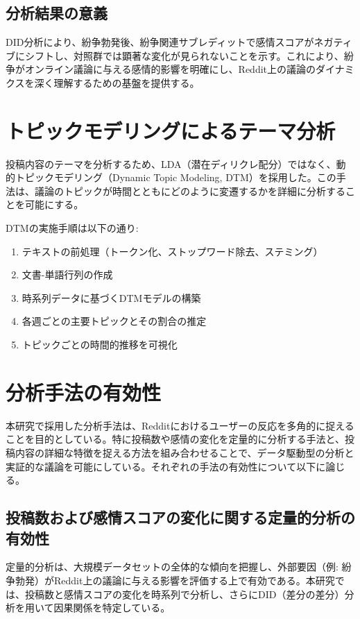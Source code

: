 \documentclass[11pt, a4j]{jreport}
\begin{document}
    \subsection*{分析結果の意義}
    DID分析により、紛争勃発後、紛争関連サブレディットで感情スコアがネガティブにシフトし、対照群では顕著な変化が見られないことを示す。これにより、紛争がオンライン議論に与える感情的影響を明確にし、Reddit上の議論のダイナミクスを深く理解するための基盤を提供する。

    \section{トピックモデリングによるテーマ分析}
    投稿内容のテーマを分析するため、LDA（潜在ディリクレ配分）ではなく、動的トピックモデリング（Dynamic Topic Modeling, DTM）を採用した。この手法は、議論のトピックが時間とともにどのように変遷するかを詳細に分析することを可能にする。

    DTMの実施手順は以下の通り:
    \begin{enumerate}
        \item テキストの前処理（トークン化、ストップワード除去、ステミング）
        \item 文書-単語行列の作成
        \item 時系列データに基づくDTMモデルの構築
        \item 各週ごとの主要トピックとその割合の推定
        \item トピックごとの時間的推移を可視化
    \end{enumerate}

    \section{分析手法の有効性}
    本研究で採用した分析手法は、Redditにおけるユーザーの反応を多角的に捉えることを目的としている。特に投稿数や感情の変化を定量的に分析する手法と、投稿内容の詳細な特徴を捉える方法を組み合わせることで、データ駆動型の分析と実証的な議論を可能にしている。それぞれの手法の有効性について以下に論じる。

    \subsection{投稿数および感情スコアの変化に関する定量的分析の有効性}
    定量的分析は、大規模データセットの全体的な傾向を把握し、外部要因（例: 紛争勃発）がReddit上の議論に与える影響を評価する上で有効である。本研究では、投稿数と感情スコアの変化を時系列で分析し、さらにDID（差分の差分）分析を用いて因果関係を特定している。
\end{document}
